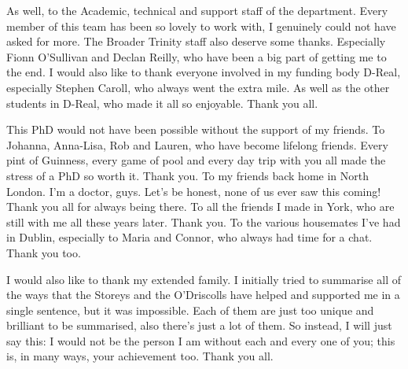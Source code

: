 \documentclass[a4paper,oneside,12pt]{book}
\numberwithin{equation}{chapter} %
\begin{document}
As well, to the Academic, technical and support staff of the department. Every member of this team has been so lovely to work with, I genuinely could not have asked for more. The Broader Trinity staff also deserve some thanks. Especially Fionn O'Sullivan and Declan Reilly, who have been a big part of getting me to the end. I would also like to thank everyone involved in my funding body D-Real, especially Stephen Caroll, who always went the extra mile. As well as the other students in D-Real, who made it all so enjoyable. Thank you all.

This PhD would not have been possible without the support of my friends. To Johanna, Anna-Lisa, Rob and Lauren, who have become lifelong friends. Every pint of Guinness, every game of pool and every day trip with you all made the stress of a PhD so worth it. Thank you. To my friends back home in North London. I'm a doctor, guys. Let's be honest, none of us ever saw this coming! Thank you all for always being there. To all the friends I made in York, who are still with me all these years later. Thank you. To the various housemates I've had in Dublin, especially to Maria and Connor, who always had time for a chat. Thank you too.




I would also like to thank my extended family. I initially tried to summarise all of the ways that the Storeys and the O'Driscolls have helped and supported me in a single sentence, but it was impossible. Each of them are just too unique and brilliant to be summarised, also there's just a lot of them. So instead, I will just say this: I would not be the person I am without each and every one of you; this is, in many ways, your achievement too. Thank you all.%
\end{document}
